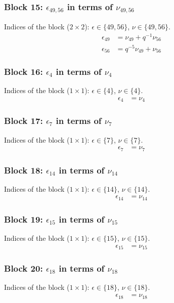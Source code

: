 \subsubsection{Block 15: $\epsilon_{49, 56}$ in terms of $\nu_{49, 56}$}
Indices of the block ($2\times 2$): $\epsilon \in \{49, 56\}$, $\nu \in \{49, 56\}$.
\begin{align*}
\epsilon_{49} &= \nu_{49} + q^{-1}\nu_{56}\\
\epsilon_{56} &= q^{-5}\nu_{49} + \nu_{56}
\end{align*}

\subsubsection{Block 16: $\epsilon_{4}$ in terms of $\nu_{4}$}
Indices of the block ($1\times 1$): $\epsilon \in \{4\}$, $\nu \in \{4\}$.
\begin{align*}
\epsilon_{4} &= \nu_{4}
\end{align*}

\subsubsection{Block 17: $\epsilon_{7}$ in terms of $\nu_{7}$}
Indices of the block ($1\times 1$): $\epsilon \in \{7\}$, $\nu \in \{7\}$.
\begin{align*}
\epsilon_{7} &= \nu_{7}
\end{align*}

\subsubsection{Block 18: $\epsilon_{14}$ in terms of $\nu_{14}$}
Indices of the block ($1\times 1$): $\epsilon \in \{14\}$, $\nu \in \{14\}$.
\begin{align*}
\epsilon_{14} &= \nu_{14}
\end{align*}

\subsubsection{Block 19: $\epsilon_{15}$ in terms of $\nu_{15}$}
Indices of the block ($1\times 1$): $\epsilon \in \{15\}$, $\nu \in \{15\}$.
\begin{align*}
\epsilon_{15} &= \nu_{15}
\end{align*}

\subsubsection{Block 20: $\epsilon_{18}$ in terms of $\nu_{18}$}
Indices of the block ($1\times 1$): $\epsilon \in \{18\}$, $\nu \in \{18\}$.
\begin{align*}
\epsilon_{18} &= \nu_{18}
\end{align*}

